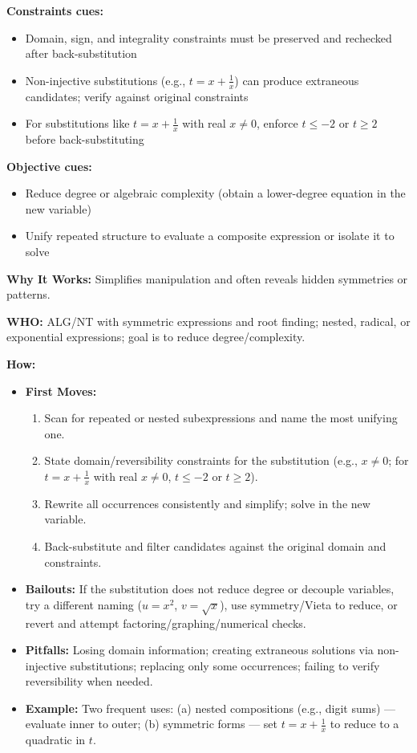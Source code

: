 \documentclass[12pt]{article}
\begin{document}
\textbf{Constraints cues:}
\begin{itemize}
    \item Domain, sign, and integrality constraints must be preserved and rechecked after back-substitution
    \item Non-injective substitutions (e.g., $t = x + \tfrac{1}{x}$) can produce extraneous candidates; verify against original constraints
    \item For substitutions like $t = x + \tfrac{1}{x}$ with real $x \ne 0$, enforce $t \le -2$ or $t \ge 2$ before back-substituting
\end{itemize}

\textbf{Objective cues:}
\begin{itemize}
    \item Reduce degree or algebraic complexity (obtain a lower-degree equation in the new variable)
    \item Unify repeated structure to evaluate a composite expression or isolate it to solve
\end{itemize}

\textbf{Why It Works:} Simplifies manipulation and often reveals hidden symmetries or patterns.

\textbf{WHO:} ALG/NT with symmetric expressions and root finding; nested, radical, or exponential expressions; goal is to reduce degree/complexity.


\textbf{How:}
\begin{itemize}
    \item \textbf{First Moves:}
    \begin{enumerate}[nosep]
        \item Scan for repeated or nested subexpressions and name the most unifying one.
        \item State domain/reversibility constraints for the substitution (e.g., $x\ne 0$; for $t=x+\tfrac{1}{x}$ with real $x\ne 0$, $t\le -2$ or $t\ge 2$).
        \item Rewrite all occurrences consistently and simplify; solve in the new variable.
        \item Back-substitute and filter candidates against the original domain and constraints.
    \end{enumerate}
    \item \textbf{Bailouts:} If the substitution does not reduce degree or decouple variables, try a different naming ($u=x^2$, $v=\sqrt{x}$), use symmetry/Vieta to reduce, or revert and attempt factoring/graphing/numerical checks.
    \item \textbf{Pitfalls:} Losing domain information; creating extraneous solutions via non-injective substitutions; replacing only some occurrences; failing to verify reversibility when needed.
    \item \textbf{Example:} Two frequent uses: (a) nested compositions (e.g., digit sums) — evaluate inner to outer; (b) symmetric forms — set $t=x+\tfrac{1}{x}$ to reduce to a quadratic in $t$.
\end{itemize}
\end{document}
